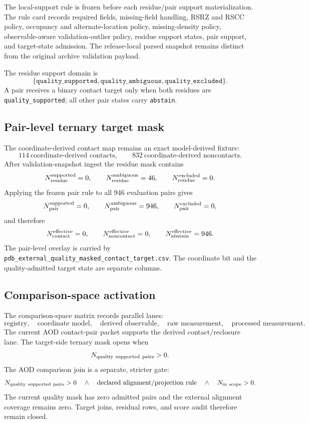 The local-support rule is frozen before each residue/pair support materialization.  The rule
card records required fields, missing-field handling, RSRZ and RSCC policy,
occupancy and alternate-location policy, missing-density policy, observable-aware
validation-outlier policy, residue support states, pair support, and target-state
admission.  The release-local parsed snapshot remains distinct from the original
archive validation payload.

The residue support domain is
\[
\{\texttt{quality\_supported},
  \texttt{quality\_ambiguous},
  \texttt{quality\_excluded}\}.
\]
A pair receives a binary contact target only when both residues are
\texttt{quality\_supported}; all other pair states carry
\texttt{abstain}.

\subsection{Pair-level ternary target mask}

The coordinate-derived contact map remains an exact model-derived fixture:
\[
114\ \text{coordinate-derived contacts},
\qquad
832\ \text{coordinate-derived noncontacts}.
\]
After validation-snapshot ingest the residue mask contains
\[
N_{\rm residue}^{\rm supported}=0,
\qquad
N_{\rm residue}^{\rm ambiguous}=46,
\qquad
N_{\rm residue}^{\rm excluded}=0.
\]
Applying the frozen pair rule to all 946 evaluation pairs gives
\[
N_{\rm pair}^{\rm supported}=0,
\qquad
N_{\rm pair}^{\rm ambiguous}=946,
\qquad
N_{\rm pair}^{\rm excluded}=0,
\]
and therefore
\[
N_{\rm contact}^{\rm effective}=0,
\qquad
N_{\rm noncontact}^{\rm effective}=0,
\qquad
N_{\rm abstain}^{\rm effective}=946.
\]
The pair-level overlay is carried by
\texttt{pdb\_external\_quality\_masked\_contact\_target.csv}.  The coordinate
bit and the quality-admitted target state are separate columns.

\subsection{Comparison-space activation}

The comparison-space matrix records parallel lanes:
\[
\text{registry},\quad
\text{coordinate model},\quad
\text{derived observable},\quad
\text{raw measurement},\quad
\text{processed measurement}.
\]
The current AOD contact-pair packet supports the derived contact/reclosure lane.
The target-side ternary mask opens when
\[
N_{\rm quality\ supported\ pairs}>0.
\]
The AOD comparison join is a separate, stricter gate:
\[
N_{\rm quality\ supported\ pairs}>0
\quad\land\quad
\text{declared alignment/projection rule}
\quad\land\quad
N_{\rm in\ scope}>0.
\]
The current quality mask has zero admitted pairs and the external alignment
coverage remains zero. Target joins, residual rows, and score audit therefore
remain closed.


